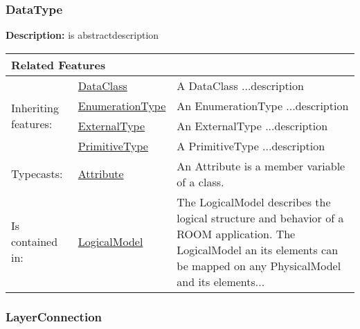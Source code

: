 		\vspace{\baselineskip}
		\vspace{\baselineskip}
		\vspace{\baselineskip}
		
		\subsubsection{\huge DataType}
			\hypertarget{ref:DataType}{}
			
			\textbf{Description:} is abstractdescription
			
			
			
			\begingroup
			\renewcommand{\arraystretch}{1.8} %
			\begin{longtable}{p{2.5cm}|p{4cm} p{}}
				\multicolumn{2}{l}{\textbf{\large Related Features}} & \\
				\hline
			\multirow{4}{*}{Inheriting features:} & \tabitem \hyperlink{ref:DataClass}{DataClass}  & A DataClass ...description \\
			& \tabitem \hyperlink{ref:EnumerationType}{EnumerationType}  & An EnumerationType ...description  \\
			& \tabitem \hyperlink{ref:ExternalType}{ExternalType}  & An ExternalType ...description  \\
			& \tabitem \hyperlink{ref:PrimitiveType}{PrimitiveType}  & A PrimitiveType ...description \\
			\hline
			Typecasts: & \tabitem \hyperlink{ref:Attribute}{Attribute}  & An Attribute is a member variable of a class. \\
			\hline
			Is contained in: & \tabitem \hyperlink{ref:LogicalModel}{LogicalModel}  & The LogicalModel describes the logical structure and behavior of a ROOM application. The LogicalModel an its elements can be mapped on any PhysicalModel and its elements...\\
			\hline
			\end{longtable}
			\endgroup
			
			
			
		\vspace{\baselineskip}
		\vspace{\baselineskip}
		\vspace{\baselineskip}
		
		\subsubsection{\huge LayerConnection}
			\hypertarget{ref:LayerConnection}{}
			
